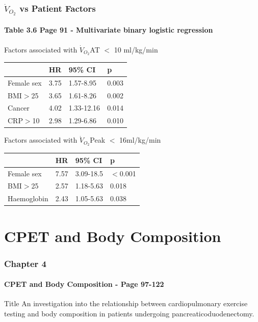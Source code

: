 \documentclass[10pt]{beamer}
\begin{document}
\begin{frame}
	\frametitle{$\dot{V}_{O_2}$ vs Patient Factors }
	\framesubtitle{Table 3.6 Page 91 - Multivariate binary logistic regression}

	Factors associated with $\dot{V}_{O_2}$AT $<$ 10 ml/kg/min
	\begin{table}
		\begin{tabular}{l l l l}
			           & HR   & 95\% CI    & p     \\ \hline
			Female sex & 3.75 & 1.57-8.95  & 0.003 \\
			BMI$>$25   & 3.65 & 1.61-8.26  & 0.002 \\
			Cancer     & 4.02 & 1.33-12.16 & 0.014 \\
			CRP$>$10   & 2.98 & 1.29-6.86  & 0.010
		\end{tabular}
	\end{table}
	
	Factors associated with $\dot{V}_{O_2}$Peak $<$ 16ml/kg/min
	\begin{table}
		\begin{tabular}{l l l l}
			            & HR   & 95\% CI   & p        \\ \hline
			Female sex  & 7.57 & 3.09-18.5 & $<$0.001 \\
			BMI$>$25    & 2.57 & 1.18-5.63 & 0.018    \\
			Haemoglobin & 2.43 & 1.05-5.63 & 0.038
		\end{tabular}
	\end{table}
\end{frame}


\section[Chapter 4]{CPET and Body Composition}

\begin{frame}
	\frametitle{Chapter 4}
	\framesubtitle{CPET and Body Composition - Page 97-122 }
	\begin{block}{Title}
		An investigation into the relationship between cardiopulmonary exercise testing and body composition in patients undergoing pancreaticoduodenectomy.
	\end{block}
\end{frame}
\end{document}
